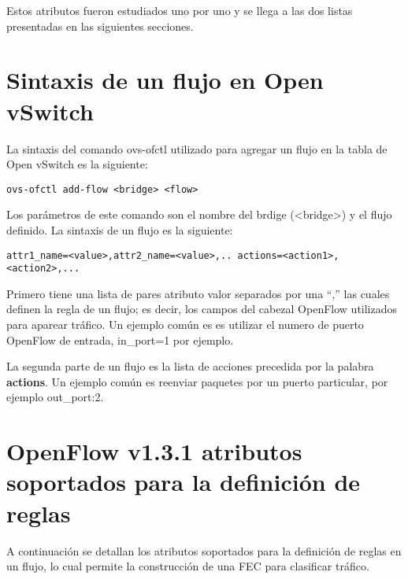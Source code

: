 Estos atributos fueron estudiados uno por uno y se llega a las dos listas presentadas en las siguientes secciones.\\

\section{Sintaxis de un flujo en Open vSwitch}
La sintaxis del comando ovs-ofctl utilizado para agregar un flujo en la tabla de Open vSwitch es la siguiente:


\begin{center}
\texttt{ovs-ofctl add-flow <bridge> <flow>}
\end{center}

Los parámetros de este comando son el nombre del brdige (<bridge>) y el flujo definido. La sintaxis de un flujo es la siguiente:

\begin{center}
\texttt{attr1\_name=<value>,attr2\_name=<value>,.. actions=<action1>,<action2>,...}
\end{center}

Primero tiene una lista de pares atributo valor separados por una “,” las cuales definen la regla de un flujo; es decir, los campos del cabezal OpenFlow utilizados para aparear tr\'afico. Un ejemplo común es es utilizar el numero de puerto OpenFlow de entrada, in\_port=1 por ejemplo.

La segunda parte de un flujo es la lista de acciones precedida por la palabra \textbf{actions}. Un ejemplo común es reenviar paquetes por un puerto particular, por ejemplo out\_port:2. 
 
\section{OpenFlow v1.3.1 atributos soportados para la definici\'on de reglas}

A continuaci\'on se detallan los atributos soportados para la definici\'on de reglas en un flujo, lo cual permite la construcci\'on de una FEC para clasificar tr\'afico.

